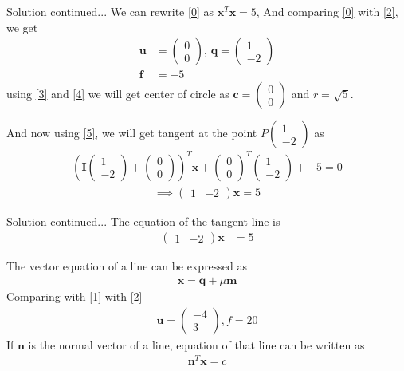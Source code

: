 \documentclass{beamer}
\renewcommand{\vec}[1]{\mathbf{#1}}
\providecommand{\brak}[1]{\ensuremath{\left(#1\right)}}
\theoremstyle{remark}
\newcommand{\myvec}[1]{\ensuremath{\begin{pmatrix}#1\end{pmatrix}}}
\numberwithin{equation}{subsection}
\let\vec\mathbf
\begin{document}
\begin{frame}{Solution continued...}
    We can rewrite \eqref{0} as $\vec{x}^T\vec{x} = 5$, And comparing \eqref{0} with \eqref{2}, we get
\begin{align}
    \vec{u}&=\myvec{0\\0},\, \vec{q}= \myvec{1\\-2}\\
    \vec{f}&=-5
\end{align}
using \eqref{3} and \eqref{4} we will get center of circle as $\vec{c} = \myvec{0\\0}$ and $r= \sqrt{5}$.

And now using \eqref{5}, we will get tangent at the point $P\myvec{1\\-2}$  as
\begin{align}
    \brak{\vec{I}\myvec{1\\-2}+\myvec{0\\0}}^T\vec{x}+\myvec{0\\0}^T\myvec{1\\-2}+{-5} = 0
\end{align}
\begin{align}
    \implies \myvec{1&-2}\vec{x}= 5
\end{align}
\end{frame}
\begin{frame}{Solution continued...}
    The equation of the tangent line is
    \begin{align}
    \myvec{1&-2}\vec{x}&= 5 \label{a}
    \end{align}

    The vector equation of a line can be expressed as 
    \begin{align}
        \vec{x} = \vec{q} +\mu\vec{m}\label{c}
    \end{align}
Comparing  with \eqref{1} with \eqref{2}
\begin{align}
\vec{u}=\myvec{-4 \\ 3}, f=20
\end{align}
If $\vec{n}$ is the normal vector of a line, equation of that line can be written as 
\begin{align}
\vec{n}^T\vec{x} = c \label{b}
\end{align}
\end{frame}
\end{document}
